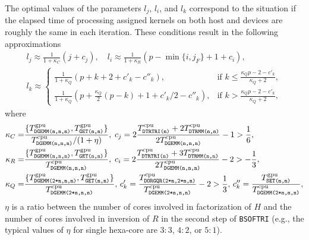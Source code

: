 \documentclass{llncs}
\newcommand{\Bsoftri}{\texttt{BSOFTRI}\xspace}
\begin{document}
The optimal values of the parameters $l_j$, $l_i$, and $l_k$ 
correspond to the situation 
if the elapsed time of processing assigned kernels
on both host and devices are roughly the same in each iteration. 
These conditions result in the following approximations 
\begin{align}
  \label{eq:l_j}
  l_j \approx \frac{1}{1 + \kappa_C} \left(j + c_j \right)
  , \quad %
  l_i \approx \frac{1}{1 + \kappa_R} \left( p-\min\{i,j_F\}+1 + c_i \right), 
  \\
  \label{eq:l_k}
    l_k \approx 
    \begin{cases}
        \displaystyle \frac{1}{1 + \kappa_Q} \left( p+k + 2 +c'_k - c''_k\right),
      & \mbox{if } k \leq \displaystyle \frac{ \kappa_{Q} p -2 - c'_{k}}{\kappa_{Q} + 2},\\ 
        \displaystyle \frac{1}{1 + \kappa_Q} \left(p  + \frac{\kappa_Q}{2}(p-k) + 1 + c'_k/2 - c''_k\right),
      & \mbox{if } k > \displaystyle \frac{ \kappa_{Q} p -2 - c'_{k}}{\kappa_{Q} + 2}, 
    \end{cases}
\end{align}
where 
\begin{align*}
  \kappa_C =& \frac{\{T_{\texttt{DGEMM(n,n,n)}}^{\rm gpu},T^{\rm gpu}_{\texttt{GET(n,n)}}\}}{T^{\rm cpu}_{\texttt{DGEMM(n,n,n)}} / (1 + \eta)} 
  , \;
  c_j = 2 \frac{T^{\rm cpu}_{\texttt{DTRTRI(n)}} + 2 T^{\rm cpu}_{\texttt{DTRMM(n,n)}}}{2 T^{\rm cpu}_{\texttt{DGEMM(n,n,n)}}} - 1 > \frac{1}{6}
  ,\;
  \\
  \kappa_R =& \frac{\{T_{\texttt{DGEMM(n,n,n)}}^{\rm gpu},T^{\rm gpu}_{\texttt{GET(n,n)}}\}}{T^{\rm cpu}_{\texttt{DGEMM(n,n,n)}}} 
  , \;
  c_i = 
  2 \frac{T^{\rm cpu}_{\texttt{DTRTRI(n)}} + 3T^{\rm cpu}_{\texttt{DTRMM(n,n)}}}{2 T^{\rm cpu}_{\texttt{DGEMM(n,n,n)}}} - 2 > -\frac{1}{3},
  \\
  \kappa_Q  =& \frac{\{T_{\texttt{DGEMM(2*n,n,n)}}^{\rm gpu},T^{\rm gpu}_{\texttt{GET(n,n)}}\}}{T^{\rm cpu}_{\texttt{DGEMM(2*n,n,n)}}} 
  , \,
  c'_k  = \frac{T^{\rm cpu}_\texttt{DORGQR(2*n,2*n,n)}}{T^{\rm cpu}_\texttt{DGEMM(2*n,n,n)}} - 2 > \frac{1}{3}
  , \,
  c''_k = {
    \frac{T^{\rm gpu}_{\texttt{SET(n,n)}}}{%
    T_{\texttt{DGEMM(2*n,n,n)}}^{\rm cpu}}}
  ,
\end{align*}
$\eta$ is a ratio between the number of cores involved in factorization of $H$
and the number of cores involved in inversion of $R$ in the second step of \Bsoftri 
(e.g., the typical values of $\eta$ for single hexa-core are $3:3$, $4:2$, or $5:1$).
\end{document}
